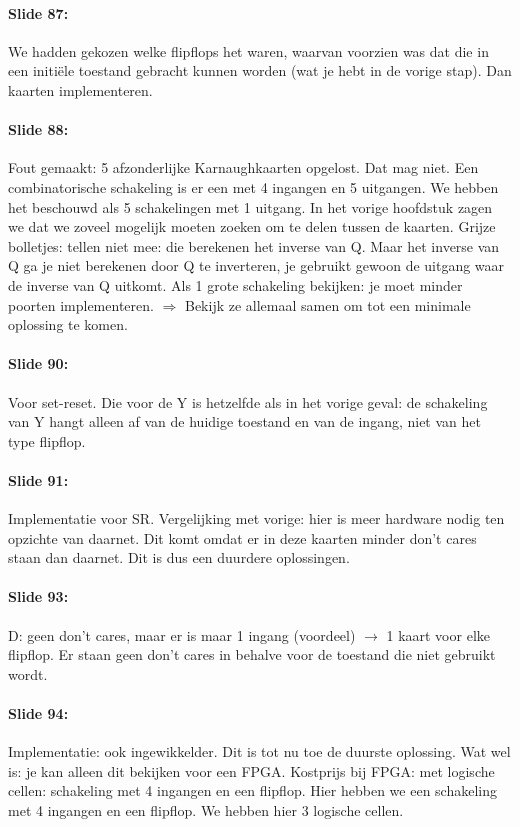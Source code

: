 \documentclass[10pt,a4paper]{book}
\begin{document}
\paragraph{Slide 87:} We hadden gekozen welke flipflops het waren, waarvan voorzien was dat die in een initi\"ele toestand gebracht kunnen worden (wat je hebt in de vorige stap). Dan kaarten implementeren.

\paragraph{Slide 88:} Fout gemaakt: 5 afzonderlijke Karnaughkaarten opgelost. Dat mag niet. Een combinatorische schakeling is er een met 4 ingangen en 5 uitgangen. We hebben het beschouwd als 5 schakelingen met 1 uitgang. In het vorige hoofdstuk zagen we dat we zoveel mogelijk moeten zoeken om te delen tussen de kaarten. Grijze bolletjes: tellen niet mee: die berekenen het inverse van Q. Maar het inverse van Q ga je niet berekenen door Q te inverteren, je gebruikt gewoon de uitgang waar de inverse van Q uitkomt.
Als 1 grote schakeling bekijken: je moet minder poorten implementeren. $\Rightarrow$ Bekijk ze allemaal samen om tot een minimale oplossing te komen. 

\paragraph{Slide 90:} Voor set-reset. Die voor de Y is hetzelfde als in het vorige geval: de schakeling van Y hangt alleen af van de huidige toestand en van de ingang, niet van het type flipflop.

\paragraph{Slide 91:} Implementatie voor SR. Vergelijking met vorige: hier is meer hardware nodig ten opzichte van daarnet. Dit komt omdat er in deze kaarten minder don't cares staan dan daarnet. Dit is dus een duurdere oplossingen.

\paragraph{Slide 93:} D: geen don't cares, maar er is maar 1 ingang (voordeel) $\rightarrow$ 1 kaart voor elke flipflop. Er staan geen don't cares in behalve voor de toestand die niet gebruikt wordt.

\paragraph{Slide 94:} Implementatie: ook ingewikkelder. Dit is tot nu toe de duurste oplossing. Wat wel is: je kan alleen dit bekijken voor een FPGA. Kostprijs bij FPGA: met logische cellen: schakeling met 4 ingangen en een flipflop. Hier hebben we een schakeling met 4 ingangen en een flipflop. We hebben hier 3 logische cellen.
\end{document}
